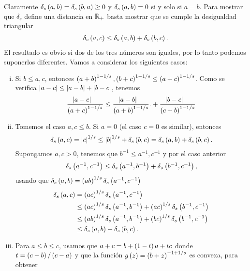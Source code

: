 \begin{dem}
	Claramente $\delta_{s}\left( a,b \right) = \delta_{s}\left( b,a \right) \ge 0$ y $\delta_{s}\left( a,b \right) = 0$ si y solo si $a = b$.
	Para mostrar que $\delta_{s}$ define una distancia en $\mathbb{R}_{+}$ basta mostrar que se cumple la desigualdad triangular
	\begin{align*}
	\delta_{s}\left( a,c \right) \le \delta_{s}\left( a,b \right) + \delta_{s}\left( b,c \right).
	\end{align*}
	El resultado es obvio si dos de los tres números son iguales, por lo tanto podemos suponerlos diferentes. Vamos a considerar los siguientes casos:
	\begin{enumerate}[i)]
		\item Si $b \le a,c$, entonces $\left( a + b \right)^{1-1/s},\left( b + c \right)^{1-1/s} \le \left( a + c \right)^{1-1/s}$.
		Como se verifica $\left| a-c \right| \le \left| a-b \right| + \left| b-c \right|$, tenemos
		\begin{align*}
		\dfrac{\left| a - c \right|\ \ \ }{\left( a + c \right)^{1-1/s}} \le \dfrac{\left| a - b \right|\ \ \ }{\left( a + b \right)^{1-1/s}} .
		+ \dfrac{\left| b - c \right|\ \ \ }{\left( c + b \right)^{1-1/s}}
		\end{align*}
		\item Tomemos el caso $a,c \le b$. Si $a=0$ (el caso $c=0$ es similar), entonces 
		\begin{align*}
		\delta_{s}\left( a,c \right) = \left| c \right|^{1/s} \le \left| b \right|^{1/s} + \delta_{s}\left( b,c \right) = \delta_{s}\left( a,b \right) + \delta_{s}\left( b,c \right).
		\end{align*}
		Supongamos $a,c>0$, tenemos que $b^{-1} \le a^{-1},c^{-1}$ y por el caso anterior
		\begin{align*}
		\delta_{s}\left( a^{-1},c^{-1} \right) \le \delta_{s}\left( a^{-1},b^{-1} \right) + \delta_{s}\left( b^{-1},c^{-1} \right),
		\end{align*}
		usando que $\delta_{s}\left( a,b \right) = \left( a b \right)^{1/s}\delta_{s}\left( a^{-1},c^{-1} \right)$
		\begin{align*}
		\delta_{s}\left( a,c \right) & = \left( a c \right)^{1/s} \delta_{s}\left( a^{-1},c^{-1} \right) \\
		& \le \left( a c \right)^{1/s} \delta_{s}\left( a^{-1},b^{-1} \right) + \left( a c \right)^{1/s} \delta_{s}\left( b^{-1},c^{-1} \right) \\
		& \le \left( a b \right)^{1/s} \delta_{s}\left( a^{-1},b^{-1} \right) + \left( b c \right)^{1/s} \delta_{s}\left( b^{-1},c^{-1} \right) \\
		& \le \delta_{s}\left( a,b \right) + \delta_{s}\left( b,c \right).
		\end{align*}
		\item Para $a \le b \le c$, usamos que $a + c = b + \left( 1-t \right) a + t c$
		donde $t = \left( c-b \right)/\left( c-a \right)$ y que la función $g\left( z \right) = \left( b+z \right)^{-1+1/s}$ es convexa, para obtener

\end{enumerate}
\end{dem}
